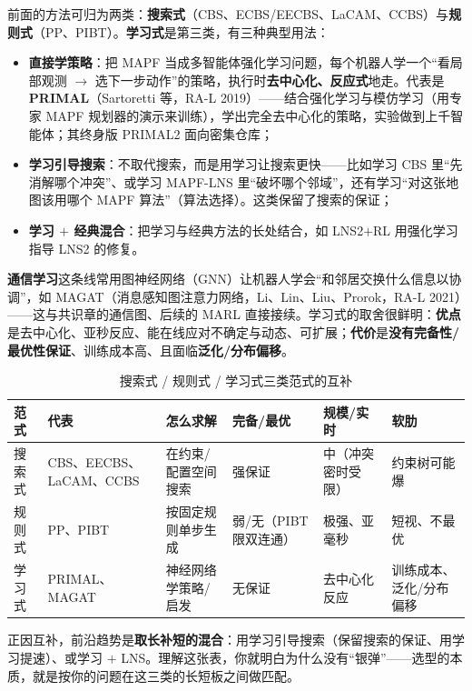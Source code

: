 前面的方法可归为两类：\textbf{搜索式}（CBS、ECBS/EECBS、LaCAM、CCBS）与\textbf{规则式}（PP、PIBT）。\textbf{学习式}是第三类，有三种典型用法：

\begin{itemize}
  \item \textbf{直接学策略}：把 MAPF 当成多智能体强化学习问题，每个机器人学一个“看局部观测 $\to$ 选下一步动作”的策略，执行时\textbf{去中心化、反应式}地走。代表是 \textbf{PRIMAL}（Sartoretti 等，RA-L 2019）\cite{sartoretti2019primal}——结合强化学习与模仿学习（用专家 MAPF 规划器的演示来训练），学出完全去中心化的策略，实验做到上千智能体；其终身版 PRIMAL2 面向密集仓库；
  \item \textbf{学习引导搜索}：不取代搜索，而是用学习让搜索更快——比如学习 CBS 里“先消解哪个冲突”、或学习 MAPF-LNS 里“破坏哪个邻域”\cite{huang2022learning}，还有学习“对这张地图该用哪个 MAPF 算法”（算法选择）。这类保留了搜索的保证；
  \item \textbf{学习 $+$ 经典混合}：把学习与经典方法的长处结合，如 LNS2$+$RL 用强化学习指导 LNS2 的修复。
\end{itemize}

\textbf{通信学习}这条线常用图神经网络（GNN）让机器人学会“和邻居交换什么信息以协调”，如 MAGAT（消息感知图注意力网络，Li、Lin、Liu、Prorok，RA-L 2021）\cite{li2021magat}——这与共识章的通信图、后续的 MARL 直接接续。学习式的取舍很鲜明：\textbf{优点}是去中心化、亚秒反应、能在线应对不确定与动态、可扩展；\textbf{代价}是\textbf{没有完备性/最优性保证}、训练成本高、且面临\textbf{泛化/分布偏移}。

\begin{table}[H]\centering\small
\caption{搜索式 / 规则式 / 学习式三类范式的互补}
\label{tab:mapf-paradigms}
\begin{tabularx}{\linewidth}{lLLLLL}
\toprule
范式 & 代表 & 怎么求解 & 完备/最优 & 规模/实时 & 软肋 \\
\midrule
搜索式 & CBS、EECBS、LaCAM、CCBS & 在约束/配置空间搜索 & 强保证 & 中（冲突密时受限） & 约束树可能爆 \\
规则式 & PP、PIBT & 按固定规则单步生成 & 弱/无（PIBT 限双连通） & 极强、亚毫秒 & 短视、不最优 \\
学习式 & PRIMAL、MAGAT & 神经网络学策略/启发 & 无保证 & 去中心化反应 & 训练成本、泛化/分布偏移 \\
\bottomrule
\end{tabularx}
\end{table}

正因互补，前沿趋势是\textbf{取长补短的混合}：用学习引导搜索（保留搜索的保证、用学习提速）、或学习 $+$ LNS。理解这张表，你就明白为什么没有“银弹”——选型的本质，就是按你的问题在这三类的长短板之间做匹配。

